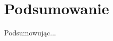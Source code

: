 \chapter{Podsumowanie}
\thispagestyle{chapterBeginStyle}
\label{ch:outro}

Podsumowując...

\cleardoublepage